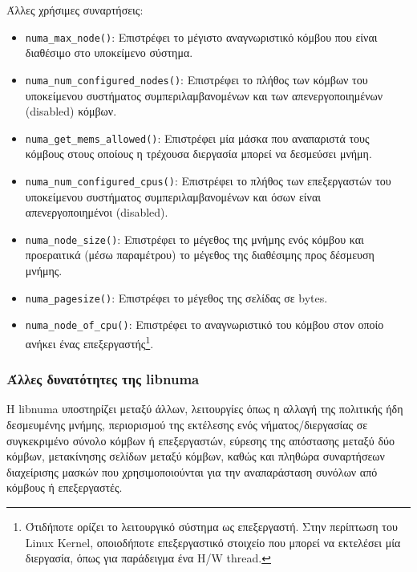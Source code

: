 \noindent Άλλες χρήσιμες συναρτήσεις:
\begin{itemize}
	\item \texttt{numa\_max\_node()}: Επιστρέφει το μέγιστο αναγνωριστικό κόμβου που είναι διαθέσιμο στο υποκείμενο σύστημα. 
	\item \texttt{numa\_num\_configured\_nodes()}: Επιστρέφει το πλήθος των κόμβων του υποκείμενου συστήματος συμπεριλαμβανομένων και των απενεργοποιημένων (disabled) κόμβων.
	\item \texttt{numa\_get\_mems\_allowed()}: Επιστρέφει μία μάσκα που αναπαριστά τους κόμβους στους οποίους  η τρέχουσα διεργασία μπορεί να δεσμεύσει μνήμη.
	\item \texttt{numa\_num\_configured\_cpus()}: Επιστρέφει το πλήθος των επεξεργαστών του υποκείμενου συστήματος συμπεριλαμβανομένων και όσων είναι απενεργοποιημένοι (disabled).
	\item \texttt{numa\_node\_size()}: Επιστρέφει το μέγεθος της μνήμης ενός κόμβου και προεραιτικά (μέσω παραμέτρου) το μέγεθος της διαθέσιμης προς δέσμευση μνήμης.
	\item \texttt{numa\_pagesize()}: Επιστρέφει το μέγεθος της σελίδας σε bytes.
	\item \texttt{numa\_node\_of\_cpu()}: Επιστρέφει το αναγνωριστικό του κόμβου στον οποίο ανήκει ένας επεξεργαστής\footnote{Ότιδήποτε ορίζει το λειτουργικό σύστημα ως επεξεργαστή. Στην περίπτωση του Linux Kernel, οποιοδήποτε επεξεργαστικό στοιχείο που μπορεί να εκτελέσει μία διεργασία, όπως για παράδειγμα ένα H/W thread.}.
\end{itemize}


\subsubsection{Άλλες δυνατότητες της libnuma}
Η libnuma υποστηρίζει μεταξύ άλλων, λειτουργίες όπως η αλλαγή της πολιτικής ήδη δεσμευμένης μνήμης, περιορισμού της εκτέλεσης ενός νήματος/διεργασίας σε συγκεκριμένο σύνολο κόμβων ή επεξεργαστών, εύρεσης της απόστασης μεταξύ δύο κόμβων, μετακίνησης σελίδων μεταξύ κόμβων, καθώς και πληθώρα συναρτήσεων διαχείρισης μασκών που χρησιμοποιούνται για την αναπαράσταση συνόλων από κόμβους ή επεξεργαστές.



